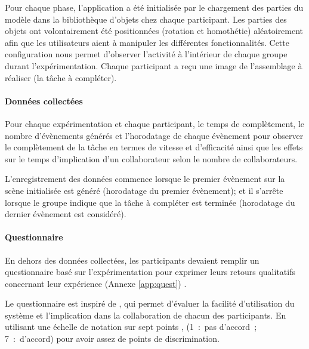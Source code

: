 Pour chaque phase, l'application a été initialisée par le chargement des parties du 
modèle dans la bibliothèque d'objets chez chaque participant. Les parties des 
objets ont volontairement été positionnées (rotation et homothétie) aléatoirement 
afin que les utilisateurs aient à manipuler les différentes fonctionnalités. Cette 
configuration nous permet d'observer l'activité à l'intérieur de chaque groupe durant 
l'expérimentation. Chaque participant a reçu une image de l'assemblage à réaliser 
(la tâche à compléter). 

\paragraph{Données collectées}
Pour chaque expérimentation et chaque participant, le temps de complètement, le 
nombre d'évènements générés et l'horodatage de chaque évènement pour 
observer le complètement de la tâche en termes de vitesse et d'efficacité ainsi 
que les effets sur le temps d'implication d'un collaborateur selon le nombre de 
collaborateurs. 

L'enregistrement des données commence lorsque le premier évènement sur la 
scène initialisée est généré (horodatage du premier évènement); et il s'arrête 
lorsque le groupe indique que la tâche à compléter est terminée (horodatage du 
dernier évènement est considéré).


\paragraph{Questionnaire}
En dehors des données collectées, les participants devaient remplir un 
questionnaire basé sur l'expérimentation pour exprimer leurs retours qualitatifs 
concernant leur expérience (Annexe \ref{app:quest}) . 

Le questionnaire est inspiré de \cite{Lewis1995}, qui permet d'évaluer la facilité 
d'utilisation du système et l'implication dans la collaboration de chacun des 
participants. En utilisant une échelle de notation sur sept points \cite{Lewis1993}, 
(1~:~pas d'accord~; 7~:~d'accord) pour avoir assez de points de discrimination.



